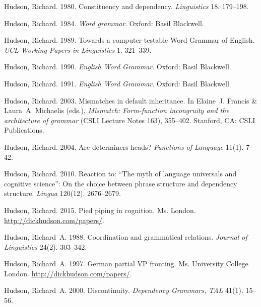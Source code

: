 \begin{thebibliography}{1420}
Hudson, Richard. 1980.
\newblock Constituency and dependency.
\newblock \emph{Linguistics} 18. 179--198.

Hudson, Richard. 1984.
\newblock \emph{Word grammar}.
\newblock Oxford: Basil Blackwell.

Hudson, Richard. 1989.
\newblock Towards a computer-testable {Word Grammar} of {English}.
\newblock \emph{UCL Working Papers in Linguistics} 1. 321--339.

Hudson, Richard. 1990.
\newblock \emph{English {Word Grammar}}.
\newblock Oxford: Basil Blackwell.

Hudson, Richard. 1991.
\newblock \emph{English {Word Grammar}}.
\newblock Oxford: Basil Blackwell.

Hudson, Richard. 2003.
\newblock Mismatches in default inheritance.
\newblock In Elaine~J. Francis \& Laura~A. Michaelis (eds.), \emph{Mismatch:
  Form-function incongruity and the architecture of grammar} (CSLI Lecture
  Notes 163), 355--402. Stanford, CA: CSLI Publications.

Hudson, Richard. 2004.
\newblock Are determiners heads?
\newblock \emph{Functions of Language} 11(1). 7--42.

Hudson, Richard. 2010{}.
\newblock Reaction to: ``{The} myth of language universals and cognitive
  science'': {On} the choice between phrase structure and dependency structure.
\newblock \emph{Lingua} 120(12). 2676--2679.

Hudson, Richard. 2015.
\newblock Pied piping in cognition.
\newblock Ms. London.
\newblock \urlprefix\url{http://dickhudson.com/papers/}.

Hudson, Richard~A. 1988.
\newblock Coordination and grammatical relations.
\newblock \emph{Journal of Linguistics} 24(2). 303--342.

Hudson, Richard~A. 1997.
\newblock German partial {VP} fronting.
\newblock Ms. University College London.
\newblock \urlprefix\url{http://dickhudson.com/papers/}.

Hudson, Richard~A. 2000.
\newblock Discontinuity.
\newblock \emph{Dependency Grammars, TAL} 41(1). 15--56.


\end{thebibliography}
